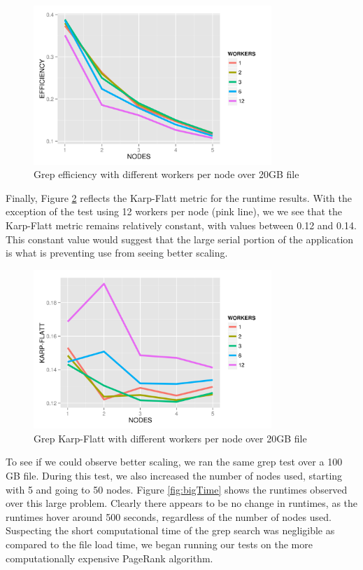 \documentclass{article}
\begin{document}
    \begin{figure}[H]
        \centering
        \includegraphics[width=90mm]{images/workerPerNodeEfficiency.png}
        \caption{Grep efficiency with different workers per node over 20GB file}
        \label{fig:workNodeEff}
    \end{figure}

Finally, Figure \ref{fig:workNodeKF} reflects the Karp-Flatt metric for the
runtime results. With the exception of the test using 12 workers per node (pink
line), we we see that the Karp-Flatt metric remains relatively constant, with
values between 0.12 and 0.14. This constant value would suggest that the
large serial portion of the application is what is preventing use from seeing
better scaling.

    \begin{figure}[H]
        \centering
        \includegraphics[width=90mm]{images/workerPerNodeKarpFlatt.png}
        \caption{Grep Karp-Flatt with different workers per node over 20GB file}
        \label{fig:workNodeKF}
    \end{figure}

To see if we could observe better scaling, we ran the same grep test over a
100 GB file. During this test, we also increased the number of nodes used,
starting with 5 and going to 50 nodes. Figure \ref{fig:bigTime} shows the
runtimes observed over this large problem.  Clearly there appears to be no
change in runtimes, as the runtimes hover around 500 seconds, regardless of the
number of nodes used. Suspecting the short computational time of the grep
search was negligible as compared to the file load time, we began running our
tests on the more computationally expensive PageRank algorithm.
\end{document}
